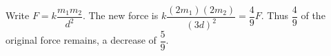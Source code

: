 Write $F=k\dfrac{m_1m_2}{d^2}$. The new force is $k\dfrac{(2m_1)(2m_2)}{(3d)^2}=\boxed{\dfrac{4}{9}F}$. Thus $\dfrac{4}{9}$ of the original force remains, a decrease of $\dfrac{5}{9}$.
